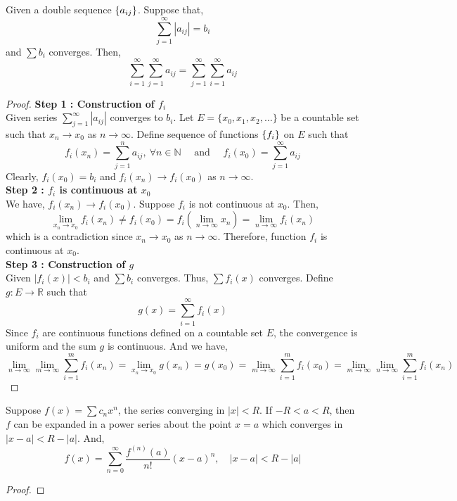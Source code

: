 \begin{theorem}
	Given a double sequence $\left\{a_{ij}\right\}$.
	Suppose that,
	\[ \sum_{j=1}^\infty |a_{ij}| = b_i \]
	and $\sum b_i$ converges.
	Then,
	\[ \sum_{i=1}^\infty \sum_{j=1}^\infty a_{ij} = \sum_{j=1}^\infty \sum_{i=1}^\infty a_{ij} \]
\end{theorem}
\begin{proof}
	\textbf{Step 1 : Construction of $f_i$}\\
	Given series $\displaystyle \sum_{j=1}^\infty |a_{ij}|$ converges to $b_i$.
	Let $E = \{ x_0,x_1,x_2,\dots \}$ be a countable set such that $x_n \to x_0$ as $n \to \infty$.
	Define sequence of functions $\left\{f_i\right\}$ on $E$ such that 
	\[ f_i(x_n) = \sum_{j=1}^n a_{ij},\ \forall n \in \mathbb{N} \quad \text{ and } \quad f_i(x_0) = \sum_{j=1}^\infty a_{ij} \]
	Clearly, $f_i(x_0) = b_i$ and $f_i(x_n) \to f_i(x_0)$ as $n \to \infty$.\\

	\textbf{Step 2 : $f_i$ is continuous at $x_0$}\\
	We have, $f_i(x_n) \to f_i(x_0)$.
	Suppose $f_i$ is not continuous at $x_0$.
	Then,
	\[ \lim_{x_n \to x_0} f_i(x_n) \ne f_i(x_0) = f_i \left(\lim_{n \to \infty} x_n \right) = \lim_{n \to \infty} f_i(x_n) \]
	which is a contradiction since $x_n \to x_0$ as $n \to \infty$.
	Therefore, function $f_i$ is continuous at $x_0$.\\

	\textbf{Step 3 : Construction of $g$}\\
	Given $|f_i(x)| < b_i$ and $\sum b_i$ converges.
	Thus, $\sum f_i(x)$ converges.
	Define $g : E \to \mathbb{R}$ such that
	\[ g(x) = \sum_{i = 1}^\infty f_i(x) \]
	Since $f_i$ are continuous functions defined on a countable set $E$, the convergence is uniform and the sum $g$ is continuous.
	And we have,
	\[ \lim_{n \to \infty} \lim_{m \to \infty} \sum_{i=1}^m f_i(x_n) = \lim_{x_n \to x_0} g(x_n) = g(x_0) = \lim_{m \to \infty} \sum_{i=1}^m f_i(x_0) = \lim_{m \to \infty} \lim_{n \to \infty} \sum_{i = 1}^m f_i(x_n) \]
\end{proof}

\begin{theorem}[Taylor]
	Suppose $f(x) = \sum c_n x^n$, the series converging in $|x| < R$.
	If $-R < a < R$, then $f$ can be expanded in a power series about the point $x = a$ which converges in $|x-a| < R-|a|$.
	And,
	\[ f(x) = \sum_{n = 0}^\infty \frac{f^{(n)}(a)}{n!} (x-a)^n,\quad |x-a| < R-|a|\]
\end{theorem}
\begin{proof}
\end{proof}

